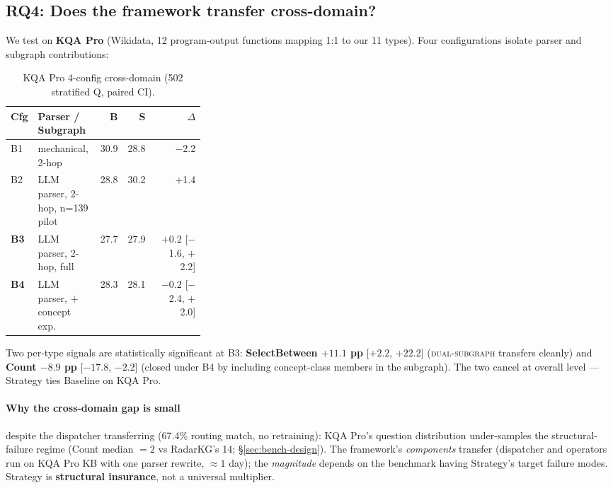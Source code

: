 \documentclass[11pt,a4paper]{article}
\newcommand{\op}[1]{\textsc{\small #1}}
\begin{document}
\subsection{RQ4: Does the framework transfer cross-domain?}
\label{sec:rq4}

We test on \textbf{KQA Pro} \citep{cao2022kqapro} (Wikidata, 12 program-output functions mapping 1:1 to our 11 types). Four configurations isolate parser and subgraph contributions:

\begin{table}[h]
\centering
\small
\caption{KQA Pro 4-config cross-domain (502 stratified Q, paired CI).}
\label{tab:kqapro}
\begin{tabular}{l p{0.32\linewidth} r r r}
\toprule
\textbf{Cfg} & \textbf{Parser / Subgraph} & \textbf{B} & \textbf{S} & \textbf{$\Delta$} \\
\midrule
B1 & mechanical, 2-hop  & 30.9 & 28.8 & $-$2.2 \\
B2 & LLM parser, 2-hop, n=139 pilot & 28.8 & 30.2 & $+$1.4 \\
\textbf{B3} & LLM parser, 2-hop, full  & 27.7 & 27.9 & $\mathbf{+0.2}$ [$-$1.6, $+$2.2] \\
\textbf{B4} & LLM parser, $+$concept exp.  & 28.3 & 28.1 & $\mathbf{-0.2}$ [$-$2.4, $+$2.0] \\
\bottomrule
\end{tabular}
\end{table}

Two per-type signals are statistically significant at B3: \textbf{SelectBetween $+11.1$ pp} [$+2.2$, $+22.2$] (\op{dual-subgraph} transfers cleanly) and \textbf{Count $-8.9$ pp} [$-17.8$, $-2.2$] (closed under B4 by including concept-class members in the subgraph). The two cancel at overall level --- Strategy ties Baseline on KQA Pro.

\paragraph{Why the cross-domain gap is small} despite the dispatcher transferring (67.4\% routing match, no retraining): KQA Pro's question distribution under-samples the structural-failure regime (Count median $=2$ vs RadarKG's 14; §\ref{sec:bench-design}). The framework's \emph{components} transfer (dispatcher and operators run on KQA Pro KB with one parser rewrite, ${\approx}1$ day); the \emph{magnitude} depends on the benchmark having Strategy's target failure modes. Strategy is \textbf{structural insurance}, not a universal multiplier.
\end{document}
